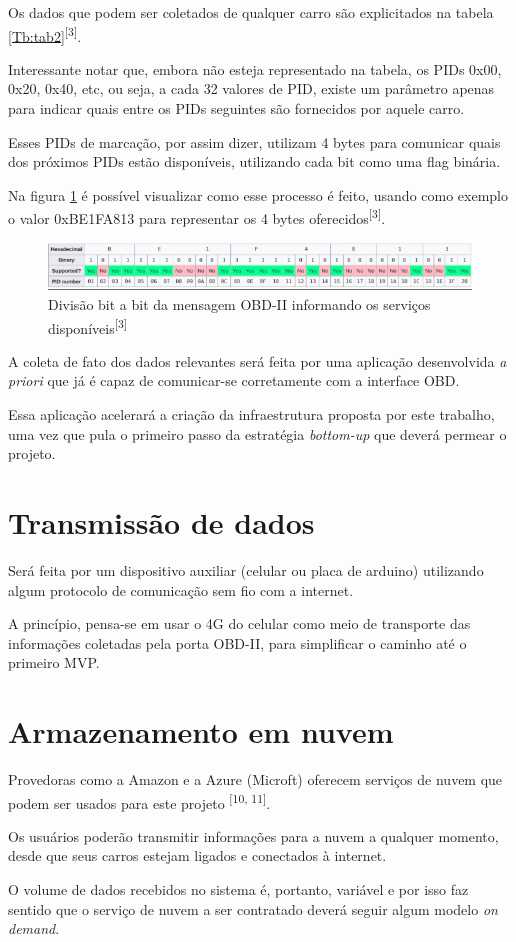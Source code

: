 Os dados que podem ser coletados de qualquer carro são explicitados na tabela \ref{Tb:tab2}\textsuperscript{[3]}.



Interessante notar que, embora não esteja representado na tabela, os PIDs 0x00, 0x20, 0x40, etc, ou seja, a cada 32 valores de PID, existe um parâmetro apenas para indicar quais entre os PIDs seguintes são fornecidos por aquele carro.

Esses PIDs de marcação, por assim dizer, utilizam 4 bytes para comunicar quais dos próximos PIDs estão disponíveis, utilizando cada bit como uma flag binária. 

Na figura \ref{fig:bitwise_obd2} é possível visualizar como esse processo é feito, usando como exemplo o valor 0xBE1FA813 para representar os 4 bytes oferecidos\textsuperscript{[3]}.

\begin{figure}[hp]
    \centering
    
    \includegraphics[scale=0.7]{figures/tabela_dados_disponiveis.png}
    
    \caption{Divisão bit a bit da mensagem OBD-II informando os serviços disponíveis\textsuperscript{[3]}}
    
    \label{fig:bitwise_obd2}
\end{figure}

A coleta de fato dos dados relevantes será feita por uma aplicação desenvolvida \textit{a priori} que já é capaz de comunicar-se corretamente com a interface OBD.

Essa aplicação acelerará a criação da infraestrutura proposta por este trabalho, uma vez que pula o primeiro passo da estratégia \textit{bottom-up} que deverá permear o projeto.

\section{Transmissão de dados}
Será feita por um dispositivo auxiliar (celular ou placa de arduino) utilizando algum protocolo de comunicação sem fio com a internet.

A princípio, pensa-se em usar o 4G do celular como meio de transporte das informações coletadas pela porta OBD-II, para simplificar o caminho até o primeiro MVP.

\section{Armazenamento em nuvem}
Provedoras como a Amazon e a Azure (Microft) oferecem serviços de nuvem que podem ser usados para este projeto \textsuperscript{[10, 11]}.

Os usuários poderão transmitir informações para a nuvem a qualquer momento, desde que seus carros estejam ligados e conectados à internet.

O volume de dados recebidos no sistema é, portanto, variável e por isso faz sentido que o serviço de nuvem a ser contratado deverá seguir algum modelo \textit{on demand}.
